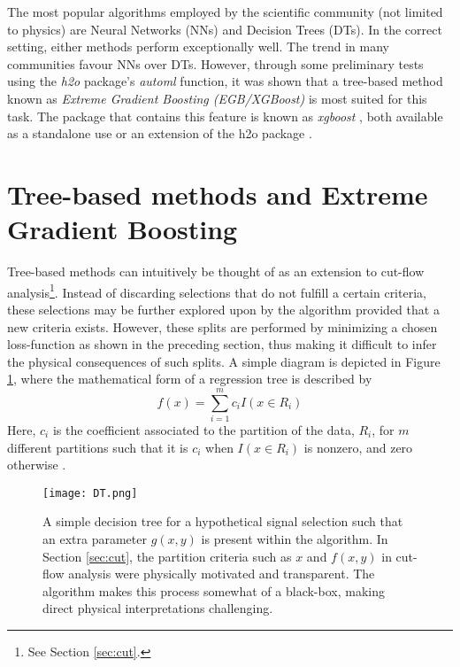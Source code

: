 The most popular algorithms employed by the scientific community (not limited to physics) are Neural Networks (NNs) and Decision Trees (DTs). In the correct setting, either methods perform exceptionally well. The trend in many communities favour NNs over DTs. However, through some preliminary tests using the \textit{h2o} package's \cite{h2o} \textit{automl} function, it was shown that a tree-based method known as \textit{Extreme Gradient Boosting (EGB/XGBoost)} is most suited for this task. The package that contains this feature is known as \textit{xgboost} , both available as a standalone use \cite{xgboost} or an extension of the h2o package \cite{h2o}. \\

\section{Tree-based methods and Extreme Gradient Boosting}
\label{sec:method}
Tree-based methods can intuitively be thought of as an extension to cut-flow analysis\footnote{See Section \ref{sec:cut}.}. Instead of discarding selections that do not fulfill a certain criteria, these selections may be further explored upon by the algorithm provided that a new criteria exists. However, these splits are performed by minimizing a chosen loss-function as shown in the preceding section, thus making it difficult to infer the physical consequences of such splits. A simple diagram is depicted in Figure \ref{fig:tree}, where the mathematical form of a regression tree is described by
\begin{equation}
    f(x) = \sum_{i=1}^m c_i I(x\in R_i)
    \label{eq:DT}
\end{equation}
Here, $c_i$ is the coefficient associated to the partition of the data, $R_i$, for $m$ different partitions such that it is $c_i$ when $I(x\in R_i)$ is nonzero, and zero otherwise \cite{james2013introduction}. \\

\begin{figure}[htbp]
    \centering
    \texttt{[image: DT.png]}
    \caption{A simple decision tree for a hypothetical signal selection such that an extra parameter $g(x,y)$ is present within the algorithm. In Section \ref{sec:cut}, the partition criteria such as $x$ and $f(x,y)$ in cut-flow analysis were physically motivated and transparent. The algorithm makes this process somewhat of a black-box, making direct physical interpretations challenging.}
    \label{fig:tree}
\end{figure}

